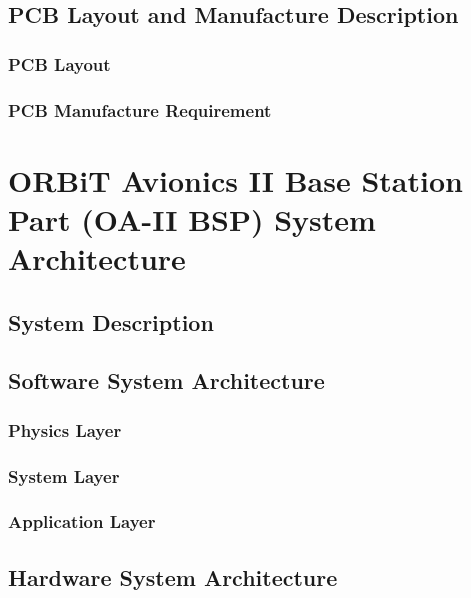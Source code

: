 \documentclass[12pt,article]{memoir}
\begin{document}
\section{PCB Layout and Manufacture Description}
\subsection{PCB Layout}
\subsection{PCB Manufacture Requirement}
\chapter{ORBiT Avionics II Base Station Part (OA-II BSP) System Architecture}
\section{System Description}
\section{Software System Architecture}
\subsection{Physics Layer}
\subsection{System Layer}
\subsection{Application Layer}
\section{Hardware System Architecture}
\end{document}

